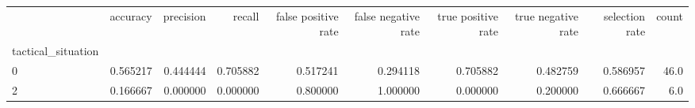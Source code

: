 \begin{tabular}{lrrrrrrrrr}
\toprule
{} &  accuracy &  precision &    recall &  false positive rate &  false negative rate &  true positive rate &  true negative rate &  selection rate &  count \\
tactical\_situation &           &            &           &                      &                      &                     &                     &                 &        \\
\midrule
0                  &  0.565217 &   0.444444 &  0.705882 &             0.517241 &             0.294118 &            0.705882 &            0.482759 &        0.586957 &   46.0 \\
2                  &  0.166667 &   0.000000 &  0.000000 &             0.800000 &             1.000000 &            0.000000 &            0.200000 &        0.666667 &    6.0 \\
\bottomrule
\end{tabular}
